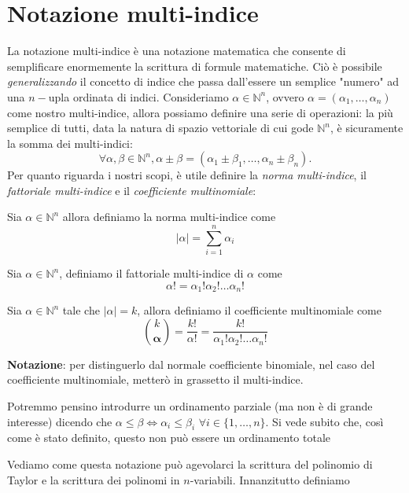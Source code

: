 \chapter{Notazione multi-indice}

La notazione multi-indice è una notazione matematica che consente di semplificare enormemente la scrittura di formule matematiche. Ciò è possibile \emph{generalizzando} il concetto di indice che passa dall'essere
un semplice "numero" ad una $n-$upla ordinata di indici. Consideriamo $\alpha \in \mathbb{N}^n$, ovvero $\alpha = (\alpha_1, \ldots, \alpha_n)$ come nostro multi-indice, allora possiamo definire una serie di operazioni: la più semplice di tutti, data la natura di spazio vettoriale di cui gode $\mathbb{N}^n$, è sicuramente la somma dei multi-indici:
$$
\forall \alpha, \beta \in \mathbb{N}^n, \alpha \pm \beta = (\alpha_1 \pm \beta_1, \ldots, \alpha_n \pm \beta_n).
$$
Per quanto riguarda i nostri scopi, è utile definire la \emph{norma multi-indice}, il \emph{fattoriale multi-indice} e il \emph{coefficiente multinomiale}:
\begin{definition}
	Sia $\alpha \in \mathbb{N}^n$ allora definiamo la norma multi-indice come
	$$
	|\alpha| = \sum_{i=1}^n \alpha_i
	$$
\end{definition}
\begin{definition}
	Sia $\alpha \in \mathbb{N}^n$, definiamo il fattoriale multi-indice di $\alpha$ come
	$$
	\alpha! = \alpha_1 ! \alpha_2 ! \ldots \alpha_n !
	$$
\end{definition}
\begin{definition}
	Sia $\alpha \in \mathbb{N}^n$ tale che $|\alpha| = k$, allora definiamo il coefficiente multinomiale come
	$$
	\binom{k}{\bm{\alpha}} = \frac{k!}{\alpha!} = \frac{k!}{\alpha_1 ! \alpha_2 ! \ldots \alpha_n !}
	$$
\end{definition}
\textbf{Notazione}: per distinguerlo dal normale coefficiente binomiale, nel caso del coefficiente multinomiale, metterò in grassetto il multi-indice.
\begin{remark}
	Potremmo pensino introdurre un ordinamento parziale (ma non è di grande interesse) dicendo che $\alpha \leq \beta \iff \alpha_i \leq \beta_i \, \, \forall i \in \{1, \ldots, n \}$. Si vede subito che, così come è stato definito, questo non può essere un ordinamento totale
\end{remark}
Vediamo come questa notazione può agevolarci la scrittura del polinomio di Taylor e la scrittura dei polinomi in $n$-variabili. Innanzitutto definiamo
